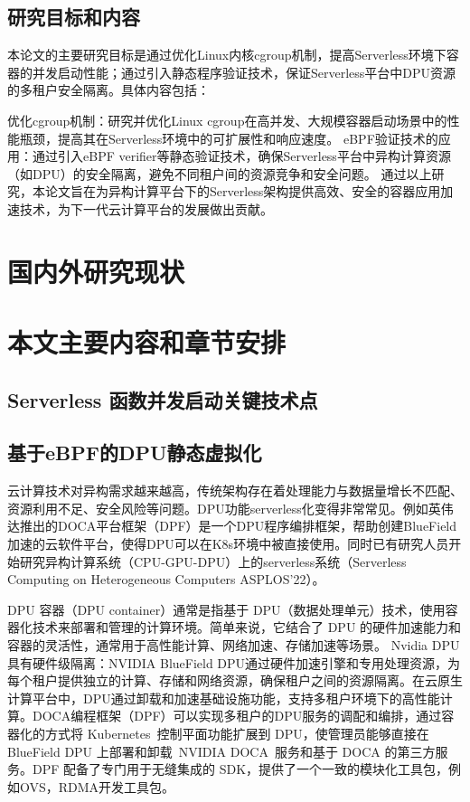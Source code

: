 \subsection{研究目标和内容}
本论文的主要研究目标是通过优化Linux内核cgroup机制，提高Serverless环境下容器的并发启动性能；通过引入静态程序验证技术，保证Serverless平台中DPU资源的多租户安全隔离。具体内容包括：

优化cgroup机制：研究并优化Linux cgroup在高并发、大规模容器启动场景中的性能瓶颈，提高其在Serverless环境中的可扩展性和响应速度。
eBPF验证技术的应用：通过引入eBPF verifier等静态验证技术，确保Serverless平台中异构计算资源（如DPU）的安全隔离，避免不同租户间的资源竞争和安全问题。
通过以上研究，本论文旨在为异构计算平台下的Serverless架构提供高效、安全的容器应用加速技术，为下一代云计算平台的发展做出贡献。

\section{国内外研究现状}

\section{本文主要内容和章节安排}






\subsection{Serverless 函数并发启动关键技术点}

\subsection{基于eBPF的DPU静态虚拟化}

云计算技术对异构需求越来越高，传统架构存在着处理能力与数据量增长不匹配、资源利用不足、安全风险等问题。DPU功能serverless化变得非常常见。例如英伟达推出的DOCA平台框架（DPF）是一个DPU程序编排框架，帮助创建BlueField加速的云软件平台，使得DPU可以在K8s环境中被直接使用。同时已有研究人员开始研究异构计算系统（CPU-GPU-DPU）上的serverless系统（Serverless Computing on Heterogeneous Computers ASPLOS’22）。

DPU 容器（DPU container）通常是指基于 DPU（数据处理单元）技术，使用容器化技术来部署和管理的计算环境。简单来说，它结合了 DPU 的硬件加速能力和容器的灵活性，通常用于高性能计算、网络加速、存储加速等场景。
Nvidia DPU具有硬件级隔离：NVIDIA BlueField DPU通过硬件加速引擎和专用处理资源，为每个租户提供独立的计算、存储和网络资源，确保租户之间的资源隔离。在云原生计算平台中，DPU通过卸载和加速基础设施功能，支持多租户环境下的高性能计算。DOCA编程框架（DPF）可以实现多租户的DPU服务的调配和编排，通过容器化的方式将 Kubernetes 控制平面功能扩展到 DPU，使管理员能够直接在 BlueField DPU 上部署和卸载 NVIDIA DOCA 服务和基于 DOCA 的第三方服务。DPF 配备了专门用于无缝集成的 SDK，提供了一个一致的模块化工具包，例如OVS，RDMA开发工具包。

